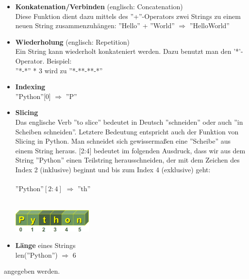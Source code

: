 \begin{itemize}
\item \textbf{Konkatenation/Verbinden} (englisch: Concatenation)\\
Diese Funktion dient dazu mittels des ''+''-Operators zwei Strings zu einem neuen String zusammenzuhängen:
''Hello'' + ''World'' $\Rightarrow$ ''HelloWorld''
\item \textbf{Wiederholung} (englisch: Repetition) \\
Ein String kann wiederholt konkateniert werden. Dazu benutzt man den '*'-Operator.
Beispiel:\\
''*-*'' * 3 wird zu ''*-**-**-*''
\item \textbf{Indexing} \\
''Python''[0] $\Rightarrow$ ''P''
\item \textbf{Slicing}\\
Das englische Verb ''to slice'' bedeutet in Deutsch ''schneiden'' oder auch ''in Scheiben schneiden''. Letztere Bedeutung entspricht auch der Funktion von Slicing in Python. Man schneidet sich gewissermaßen eine ''Scheibe'' aus einem String heraus. [2:4] bedeutet im folgenden Ausdruck, dass wir aus dem String ''Python'' einen Teilstring herausschneiden, der mit dem Zeichen des Index 2 (inklusive) beginnt und bis zum Index 4 (exklusive) geht: \\
\\
''Python''$[2:4]$ $\Rightarrow$ ''th'' \\
\\
\begin{minipage}{-0.8\textwidth}
\includegraphics[width=4cm, height=1.2cm]{pics/string_slicing.png}
\label{fig:string_slicing}
\end{minipage}
\item \textbf{Länge} eines Strings \\
len(''Python'') $\Rightarrow$ 6 
\end{itemize}
angegeben werden. \\
\\
